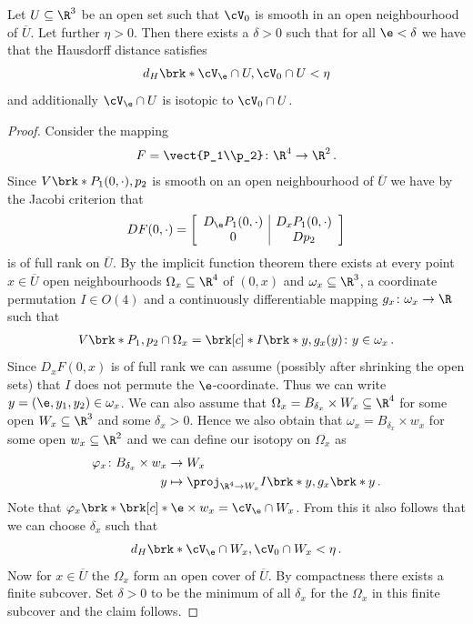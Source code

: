 \begin{proposition}\label{pr:n3_polynomial_convergenceSmoothSet}
  Let $U\subseteq \R^3$ be an open set such that $\cV_0$ is smooth
  in an open neighbourhood of $\overline{U}$. Let further $\eta>0$.
  Then there exists a $\delta>0$ such that for all $\e<\delta$ we have that the Hausdorff distance
  satisfies
  \begin{align*}
    d_H\brk*{\cV_\e\cap U,\cV_0\cap U}<\eta
  \end{align*}
  and additionally $\cV_\e\cap U$ is isotopic to $\cV_0\cap U$.
\end{proposition}
\begin{proof}
  Consider the mapping
  \begin{align*}
    F=\vect{P_1\\p_2}\colon \R^4\to\R^2\,.
  \end{align*}
  Since $V\brk*{P_1(0,\cdot),p_2}$ is smooth on an open neighbourhood of $\overline{U}$
  we have by the Jacobi criterion that
  \begin{align}
    DF(0,\cdot) = \left[\begin{array}{c|c}
        D_\e P_1(0,\cdot)&D_x P_1(0,\cdot)\\
        0&D p_2
      \end{array}\right]\label{eq:n3_polynomial_homotopic_df}
  \end{align}
  is of full rank on $\overline{U}$.
  By the implicit function theorem there exists at every point $x\in\overline{U}$ open neighbourhoods
  $\Omega_x\subseteq \R^4$ of $(0,x)$ and $\omega_x\subseteq\R^3$, a coordinate permutation $I\in O(4)$
  and a continuously differentiable mapping $g_x\colon\omega_x\to\R$ such that
  \begin{align*}
    V\brk*{P_1,p_2}\cap \Omega_x=\brk[c]*{I\brk*{y,g_x(y)}\colon y\in\omega_x}\,.
  \end{align*}
  Since $D_xF(0,x)$ is of full rank we can assume (possibly after shrinking the open sets) that $I$ does not permute the $\e$-coordinate.
  Thus we can write $y=(\e,y_1,y_2)\in\omega_x$.
  We can also assume that $\Omega_x=B_{\delta_x}\times W_x\subseteq\R^4$ for some open $W_x\subseteq\R^3$ and 
  some $\delta_x>0$.
  Hence we also obtain that $\omega_x=B_{\delta_x}\times w_x$ for some open $w_x\subseteq\R^2$ and we can define our
  isotopy on $\Omega_x$ as
  \begin{align*}
    \varphi_x\colon B_{\delta_x}\times w_x&\to W_x\\
    y&\mapsto \proj_{\R^4\to W_x}I\brk*{y,g_x\brk*{y}}\,.
  \end{align*}
  Note that $\varphi_x\brk*{\brk[c]*{\e}\times w_x}=\cV_\e\cap W_x$.
  From this it also follows that we can choose $\delta_x$
  such that
  \begin{align*}
    d_H\brk*{\cV_\e\cap W_x,\cV_0\cap W_x}<\eta\,.
  \end{align*}
  Now for $x\in\overline{U}$ the $\Omega_x$ form an open cover of $\overline{U}$.
  By compactness there exists a finite subcover.
  Set $\delta>0$ to be the minimum of all 
  $\delta_x$ for the $\Omega_x$ in this finite subcover and the claim follows.
\end{proof}

